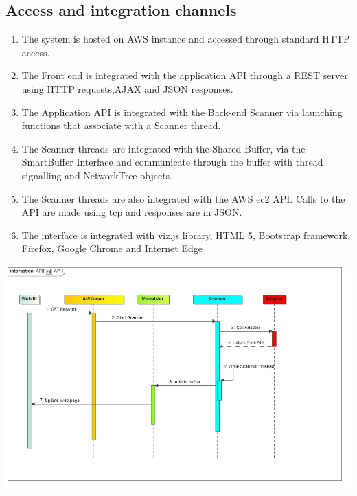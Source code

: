 \documentclass[hidelinks,a4paper,12pt]{article}
\begin{document}
\subsection{Access and integration channels}
\begin{enumerate} 
\item The system is hosted on AWS instance and accessed through standard HTTP access.
\item The Front end is integrated with the application API through a REST server using HTTP requests,AJAX and JSON responses.
\item The Application API is integrated with the Back-end Scanner via launching functions that associate with a Scanner thread. 
\item The Scanner threads are integrated with the Shared Buffer, via the SmartBuffer Interface and communicate through the buffer with thread signalling and NetworkTree objects.
\item The Scanner threads are also integrated with the AWS ec2 API. Calls to the API are made using tcp and responses are in JSON.
\item The interface is integrated with viz.js library, HTML 5, Bootstrap framework, Firefox, Google Chrome and Internet Edge
\end{enumerate}

\includegraphics[width=1.00\textwidth]{./images/API.jpg}\\[0.4cm] 
\end{document}
